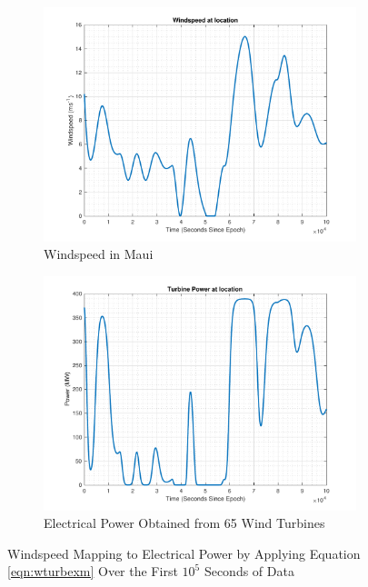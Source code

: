 \begin{figure}[t]
\centering
\begin{subfigure}{.5\textwidth}
  \centering
  \includegraphics[scale=0.4]{./images/AWindspeed-eps-converted-to.pdf}
  \caption{Windspeed in Maui}
  \label{fig:windspeed}
\end{subfigure}%
\begin{subfigure}{.5\textwidth}
  \centering
  \includegraphics[scale=0.4]{./images/AWindpower-eps-converted-to.pdf}
  \caption{Electrical Power Obtained from 65 Wind Turbines}
  \label{fig:windpower}
\end{subfigure}
        \caption{Windspeed Mapping to Electrical Power by Applying Equation \ref{eqn:wturbexm} Over the First $10^5$ Seconds of Data}
\label{fig:speedpowermap}
\end{figure}
